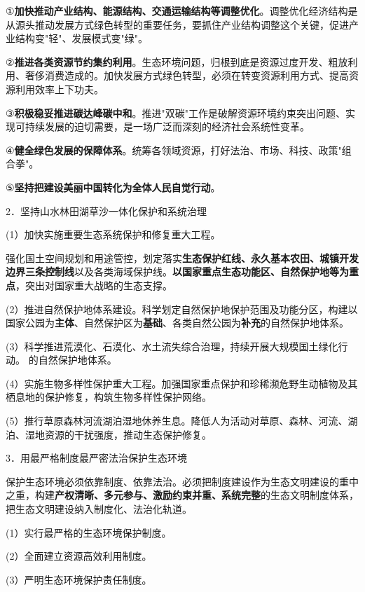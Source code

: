 \documentclass[lang=cn,10pt]{elegantbook}
\begin{document}
	①\textbf{加快推动产业结构、能源结构、交通运输结构等调整优化}。调整优化经济结构是从源头推动发展方式绿色转型的重要任务，要抓住产业结构调整这个关键，促进产业结构变"轻"、发展模式变"绿"。
	
	②\textbf{推进各类资源节约集约利用}。生态环境问题，归根到底是资源过度开发、粗放利用、奢侈消费造成的。加快发展方式绿色转型，必须在转变资源利用方式、提高资源利用效率上下功夫。
	
	③\textbf{积极稳妥推进碳达峰碳中和}。推进"双碳"工作是破解资源环境约束突出问题、实现可持续发展的迫切需要，是一场广泛而深刻的经济社会系统性变革。
	
	④\textbf{健全绿色发展的保障体系}。统筹各领域资源，打好法治、市场、科技、政策"组合拳"。
	
	⑤\textbf{坚持把建设美丽中国转化为全体人民自觉行动}。
	
	2．坚持山水林田湖草沙一体化保护和系统治理
	
	(1）加快实施重要生态系统保护和修复重大工程。
	
	强化国土空间规划和用途管控，划定落实\textbf{生态保护红线、永久基本农田、城镇开发边界三条控制线}以及各类海域保护线。\textbf{以国家重点生态功能区、自然保护地等为重点}，突出对国家重大战略的生态支撑。
	
	(2）推进自然保护地体系建设。科学划定自然保护地保护范围及功能分区，构建以国家公园为\textbf{主体}、自然保护区为\textbf{基础}、各类自然公园为\textbf{补充}的自然保护地体系。
	
	(3）科学推进荒漠化、石漠化、水土流失综合治理，持续开展大规模国土绿化行动。
	的自然保护地体系。
	
	(4）实施生物多样性保护重大工程。加强国家重点保护和珍稀濒危野生动植物及其栖息地的保护修复，构筑生物多样性保护网络。
	
	(5）推行草原森林河流湖泊湿地休养生息。降低人为活动对草原、森林、河流、湖泊、湿地资源的干扰强度，推动生态保护修复。
	
	3．用最严格制度最严密法治保护生态环境
	
	保护生态环境必须依靠制度、依靠法治。必须把制度建设作为生态文明建设的重中之重，构建\textbf{产权清晰、多元参与、激励约束并重、系统完整}的生态文明制度体系，把生态文明建设纳入制度化、法治化轨道。
	
	(1）实行最严格的生态环境保护制度。
	
	(2）全面建立资源高效利用制度。
	
	(3）严明生态环境保护责任制度。
	
\end{document}
